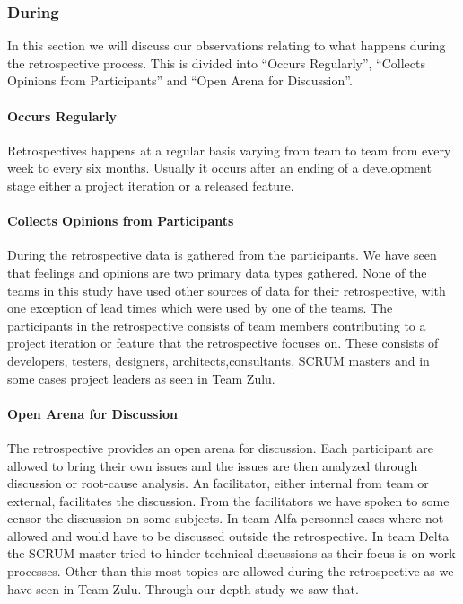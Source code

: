 \subsubsection{During}
In this section we will discuss our observations relating to what happens during the retrospective process. This is divided into ``Occurs Regularly'', ``Collects Opinions from Participants'' and ``Open Arena for Discussion''.

\paragraph{Occurs Regularly}
Retrospectives happens at a regular basis varying from team to team from every week to every six months. Usually it occurs after an ending of a development stage either a project iteration or a released feature.

\paragraph{Collects Opinions from Participants}
During the retrospective data is gathered from the participants. We have seen that feelings and opinions are two primary data types gathered. None of the teams in this study have used other sources of data for their retrospective, with one exception of lead times which were used by one of the teams. The participants in the retrospective consists of team members contributing to a project iteration or feature that the retrospective focuses on. These consists of developers, testers, designers, architects,consultants, SCRUM masters and in some cases project leaders as seen in Team Zulu. 

\paragraph{Open Arena for Discussion}
The retrospective provides an open arena for discussion. Each participant are allowed to bring their own issues and the issues are then analyzed through discussion or root-cause analysis. An facilitator, either internal from team or external, facilitates the discussion. From the facilitators we have spoken to some censor the discussion on some subjects. In team Alfa personnel cases where not allowed and would have to be discussed outside the retrospective. In team Delta the SCRUM master tried to hinder technical discussions as their focus is on work processes. Other than this most topics are allowed during the retrospective as we have seen in Team Zulu. Through our depth study we saw that.

